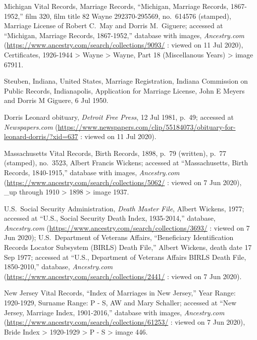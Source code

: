 \begin{thebibliography}{999}
Michigan Vital Records, Marriage Records, ``Michigan, Marriage Records, 1867-1952,'' film 320, film title 82 Wayne 292370-295569, no.\ 614576 (stamped), Marriage License of Robert C.\ May and Dorris M.\ Giguere; accessed at ``Michigan, Marriage Records, 1867-1952,'' database with images, \textit{Ancestry.com} (\url{https://www.ancestry.com/search/collections/9093/} : viewed on 11 Jul 2020), Certificates, 1926-1944 > Wayne > Wayne, Part 18 (Miscellanous Years) > image 67911.

Steuben, Indiana, United States, Marriage Registration, Indiana Commission on Public Records, Indianapolis, Application for Marriage License, John E Meyers and Dorris M Giguere, 6 Jul 1950.

Dorris Leonard obituary, \textit{Detroit Free Press}, 12 Jul 1981, p.\ 49; accessed at \textit{Newspapers.com} (\url{https://www.newspapers.com/clip/55184073/obituary-for-leonard-dorris/?xid=637} : viewed on 11 Jul 2020).


Massachusetts Vital Records, Birth Records, 1898, p.\ 79 (written), p.\ 77 (stamped), no.\ 3523, Albert Francis Wickens; accessed at ``Massachusetts, Birth Records, 1840-1915,'' database with images, \textit{Ancestry.com} (\url{https://www.ancestry.com/search/collections/5062/} : viewed on 7 Jun 2020), \_up through 1910 > 1898 > image 1937.

U.S.\ Social Security Administration, \textit{Death Master File}, Albert Wickens, 1977; accessed at ``U.S., Social Security Death Index, 1935-2014,'' database, \textit{Ancestry.com} (\url{https://www.ancestry.com/search/collections/3693/} : viewed on 7 Jun 2020); U.S.\ Department of Veterans Affairs, ``Beneficiary Identification Records Locator Subsystem (BIRLS) Death File,'' Albert Wickens, death date 17 Sep 1977; accessed at ``U.S., Department of Veterans Affairs BIRLS Death File, 1850-2010,'' database, \textit{Ancestry.com} (\url{https://www.ancestry.com/search/collections/2441/} : viewed on 7 Jun 2020).

New Jersey Vital Records, ``Index of Marriages in New Jersey,'' Year Range: 1920-1929, Surname Range: P - S, AW and Mary Schaller; accessed at ``New Jersey, Marriage Index, 1901-2016,'' database with images, \textit{Ancestry.com} (\url{https://www.ancestry.com/search/collections/61253/} : viewed on 7 Jun 2020), Bride Index > 1920-1929 > P - S > image 446.


\end{thebibliography}
